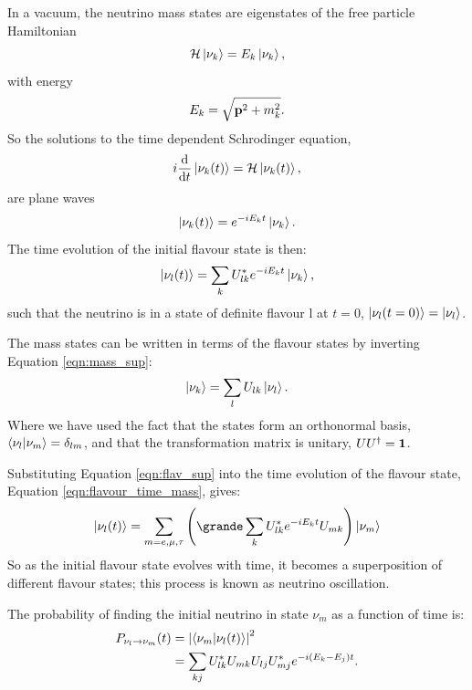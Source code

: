 In a vacuum, the neutrino mass states are eigenstates of the free particle Hamiltonian
\begin{equation}
	\label{eqn:ham_eig}
	{\cal H} \ket{\nu_k} = E_k \ket{\nu_k},
\end{equation}
with energy
\begin{equation}
	\label{eqn:nu_en}
	E_k = \sqrt{\vb{p}^2 + m_k^2}.
\end{equation}
So the solutions to the time dependent Schrodinger equation, 
\begin{equation}
	\label{eqn:tdse}
	i\dv{t}\ket{\nu_k(t)} = {\cal H}\ket{\nu_k(t)},
\end{equation}
are plane waves
\begin{equation}
	\label{eqn:plane_wave}
	\ket{\nu_k(t)} = e^{-iE_kt}\ket{\nu_k}.
\end{equation}
The time evolution of the initial flavour state is then:
\begin{equation}
	\label{eqn:flavour_time_mass}
	\ket{\nu_l(t)} = \sum_k U_{lk}^* e^{-iE_kt} \ket{\nu_k}, 
\end{equation}
such that the neutrino is in a state of definite flavour l at \(t = 0\), 
\(\ket{\nu_l(t=0)} = \ket{\nu_l}\).

The mass states can be written in terms of the flavour states by inverting
Equation \ref{eqn:mass_sup}:
\begin{equation}
	\label{eqn:flav_sup}
	\ket{\nu_k} = \sum_l U_{lk} \ket{\nu_l}.
\end{equation}
Where we have used the fact that the states form an orthonormal basis,
\(\braket{\nu_l}{\nu_m} = \delta_{lm}\), and that the transformation matrix is 
unitary, \(UU^\dagger = \vb{1}\).

Substituting Equation \ref{eqn:flav_sup} into the time evolution of the flavour
state, Equation \ref{eqn:flavour_time_mass}, gives:
\begin{equation}
	\label{eqn:flavour_time_flav}
	\ket{\nu_l(t)} = \sum_{m = e, \mu, \tau} \qty(\grande \sum_k U^*_{lk} e^{-iE_kt} U_{mk})\ket{\nu_m} 
\end{equation}
So as the initial flavour state evolves with time, it becomes a superposition 
of different flavour states; this process is known as neutrino oscillation.

The probability of finding the initial neutrino in state \(\nu_m\) as a 
function of time is:
\begin{align}
	\label{eqn:p_osc_u}
	P_{\nu_l \rightarrow \nu_m}(t) &= \abs{\braket{\nu_m}{\nu_l(t)}}^2 \\
	                               &= \sum_{kj} U^*_{lk} U_{mk} U_{lj} U^*_{mj} e^{-i(E_k - E_j)t}.
\end{align}

